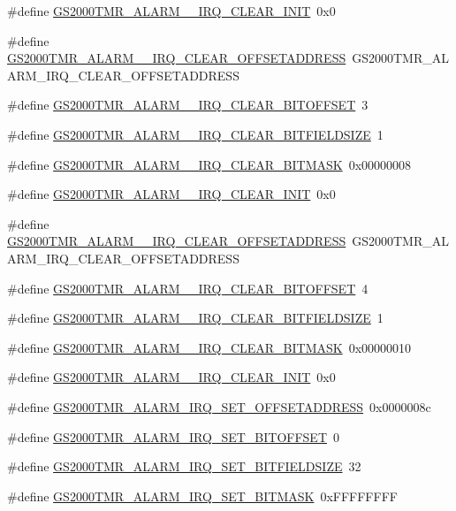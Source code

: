 \begin{DoxyCompactItemize}
\item 
\#define \hyperlink{a00556_ab7e652589270199f5a859ce56fbd0584}{GS2000TMR\_\-ALARM\_\_\-IRQ\_\-CLEAR\_\-INIT}~0x0
\item 
\#define \hyperlink{a00556_a29a40ea885181ed4ada0f1de6bd2af59}{GS2000TMR\_\-ALARM\_\_\-IRQ\_\-CLEAR\_\-OFFSETADDRESS}~GS2000TMR\_\-ALARM\_\-IRQ\_\-CLEAR\_\-OFFSETADDRESS
\item 
\#define \hyperlink{a00556_a49c47c1600351caf1b3d08fe71b85431}{GS2000TMR\_\-ALARM\_\_\-IRQ\_\-CLEAR\_\-BITOFFSET}~3
\item 
\#define \hyperlink{a00556_ae1162b6fa27890f5b6e91e8a3b695668}{GS2000TMR\_\-ALARM\_\_\-IRQ\_\-CLEAR\_\-BITFIELDSIZE}~1
\item 
\#define \hyperlink{a00556_ac2eaf50739e5dfc79bde791bc0218486}{GS2000TMR\_\-ALARM\_\_\-IRQ\_\-CLEAR\_\-BITMASK}~0x00000008
\item 
\#define \hyperlink{a00556_a2e3678c28a46cf09afb7122e60795f08}{GS2000TMR\_\-ALARM\_\_\-IRQ\_\-CLEAR\_\-INIT}~0x0
\item 
\#define \hyperlink{a00556_a40e35273e031bbf223a65728db918282}{GS2000TMR\_\-ALARM\_\_\-IRQ\_\-CLEAR\_\-OFFSETADDRESS}~GS2000TMR\_\-ALARM\_\-IRQ\_\-CLEAR\_\-OFFSETADDRESS
\item 
\#define \hyperlink{a00556_a8f4eae659b814dc2d21aa4705b159977}{GS2000TMR\_\-ALARM\_\_\-IRQ\_\-CLEAR\_\-BITOFFSET}~4
\item 
\#define \hyperlink{a00556_a96dd01fe6da34c7615e50cedd374f731}{GS2000TMR\_\-ALARM\_\_\-IRQ\_\-CLEAR\_\-BITFIELDSIZE}~1
\item 
\#define \hyperlink{a00556_ae92b8777d4a799889725cd68fd34442f}{GS2000TMR\_\-ALARM\_\_\-IRQ\_\-CLEAR\_\-BITMASK}~0x00000010
\item 
\#define \hyperlink{a00556_a83e583b496cef9c34b53f8403239debd}{GS2000TMR\_\-ALARM\_\_\-IRQ\_\-CLEAR\_\-INIT}~0x0
\item 
\#define \hyperlink{a00556_ab6a1358756596f1634dac4344c0db122}{GS2000TMR\_\-ALARM\_\-IRQ\_\-SET\_\-OFFSETADDRESS}~0x0000008c
\item 
\#define \hyperlink{a00556_af46f154b7f441e7ae3c12270914d608f}{GS2000TMR\_\-ALARM\_\-IRQ\_\-SET\_\-BITOFFSET}~0
\item 
\#define \hyperlink{a00556_a98d7842caaa5b7ff4f4323be44bc2183}{GS2000TMR\_\-ALARM\_\-IRQ\_\-SET\_\-BITFIELDSIZE}~32
\item 
\#define \hyperlink{a00556_ab234ce0de1817ad5362e99d163aa813e}{GS2000TMR\_\-ALARM\_\-IRQ\_\-SET\_\-BITMASK}~0xFFFFFFFF
\item 

\end{DoxyCompactItemize}
